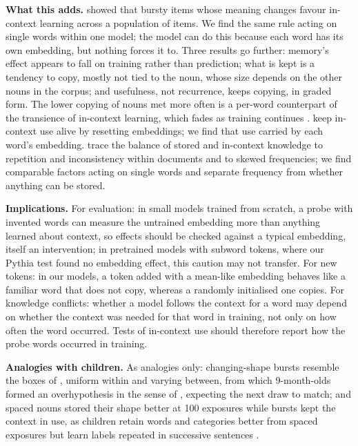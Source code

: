 \documentclass{article}
\begin{document}
\textbf{What this adds.} \citet{chan2022} showed that bursty items whose meaning changes favour in-context learning across a population of items. We find the same rule acting on single words within one model; the model can do this because each word has its own embedding, but nothing forces it to. Three results go further: memory's effect appears to fall on training rather than prediction; what is kept is a tendency to copy, mostly not tied to the noun, whose size depends on the other nouns in the corpus; and usefulness, not recurrence, keeps copying, in graded form. The lower copying of nouns met more often is a per-word counterpart of the transience of in-context learning, which fades as training continues \citep{singh2023}. \citet{anand2025} keep in-context use alive by resetting embeddings; we find that use carried by each word's embedding. \citet{kim2026training} trace the balance of stored and in-context knowledge to repetition and inconsistency within documents and to skewed frequencies; we find comparable factors acting on single words and separate frequency from whether anything can be stored.

\textbf{Implications.} For evaluation: in small models trained from scratch, a probe with invented words can measure the untrained embedding more than anything learned about context, so effects should be checked against a typical embedding, itself an intervention; in pretrained models with subword tokens, where our Pythia test found no embedding effect, this caution may not transfer. For new tokens: in our models, a token added with a mean-like embedding behaves like a familiar word that does not copy, whereas a randomly initialised one copies. For knowledge conflicts: whether a model follows the context for a word may depend on whether the context was needed for that word in training, not only on how often the word occurred. Tests of in-context use should therefore report how the probe words occurred in training.

\textbf{Analogies with children.} As analogies only: changing-shape bursts resemble the boxes of \citet{dewar2010}, uniform within and varying between, from which 9-month-olds formed an overhypothesis in the sense of \citet{kemp2007}, expecting the next draw to match; and spaced nouns stored their shape better at 100 exposures while bursts kept the context in use, as children retain words and categories better from spaced exposures \citep{childers2002,vlach2008} but learn labels repeated in successive sentences \citep{schwab2016}.
\end{document}
